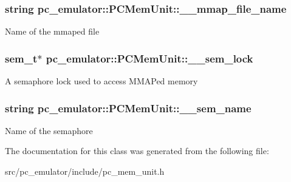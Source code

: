 \subsubsection[{\texorpdfstring{\+\_\+\+\_\+mmap\+\_\+file\+\_\+name}{__mmap_file_name}}]{\setlength{\rightskip}{0pt plus 5cm}string pc\+\_\+emulator\+::\+P\+C\+Mem\+Unit\+::\+\_\+\+\_\+mmap\+\_\+file\+\_\+name}\hypertarget{classpc__emulator_1_1PCMemUnit_a0fcd708b1a7ee5ec5f6ba24d4b24a324}{}\label{classpc__emulator_1_1PCMemUnit_a0fcd708b1a7ee5ec5f6ba24d4b24a324}
Name of the mmaped file 
\subsubsection[{\texorpdfstring{\+\_\+\+\_\+sem\+\_\+lock}{__sem_lock}}]{\setlength{\rightskip}{0pt plus 5cm}sem\+\_\+t$\ast$ pc\+\_\+emulator\+::\+P\+C\+Mem\+Unit\+::\+\_\+\+\_\+sem\+\_\+lock}\hypertarget{classpc__emulator_1_1PCMemUnit_a77c288dd119a5ecd08bc793ed6a9b4cf}{}\label{classpc__emulator_1_1PCMemUnit_a77c288dd119a5ecd08bc793ed6a9b4cf}
A semaphore lock used to access M\+M\+AP\textquotesingle{}ed memory 
\subsubsection[{\texorpdfstring{\+\_\+\+\_\+sem\+\_\+name}{__sem_name}}]{\setlength{\rightskip}{0pt plus 5cm}string pc\+\_\+emulator\+::\+P\+C\+Mem\+Unit\+::\+\_\+\+\_\+sem\+\_\+name}\hypertarget{classpc__emulator_1_1PCMemUnit_afa96f416f54665c3363aa4b110a6bcd9}{}\label{classpc__emulator_1_1PCMemUnit_afa96f416f54665c3363aa4b110a6bcd9}
Name of the semaphore 

The documentation for this class was generated from the following file\+:\begin{DoxyCompactItemize}
\item 
src/pc\+\_\+emulator/include/pc\+\_\+mem\+\_\+unit.\+h\end{DoxyCompactItemize}
